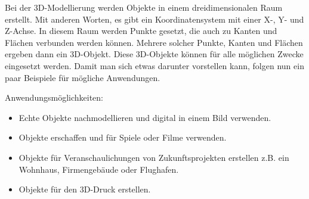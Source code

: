 Bei der 3D-Modellierung werden Objekte in einem dreidimensionalen Raum erstellt. Mit anderen Worten, es gibt ein Koordinatensystem mit einer X-, Y- und Z-Achse.
In diesem Raum werden Punkte gesetzt, die auch zu Kanten und Flächen verbunden werden können. Mehrere solcher Punkte, Kanten und Flächen ergeben dann ein 3D-Objekt.
Diese 3D-Objekte können für alle möglichen Zwecke eingesetzt werden. Damit man sich etwas darunter vorstellen kann, folgen nun ein paar Beispiele für
mögliche Anwendungen.

Anwendungsmöglichkeiten:
\begin{itemize}
    \item Echte Objekte nachmodellieren und digital in einem Bild verwenden.
    \item Objekte erschaffen und für Spiele oder Filme verwenden.
    \item Objekte für Veranschaulichungen von Zukunftsprojekten erstellen z.B. ein Wohnhaus, Firmengebäude oder Flughafen.
    \item Objekte für den 3D-Druck erstellen.
\end{itemize}
